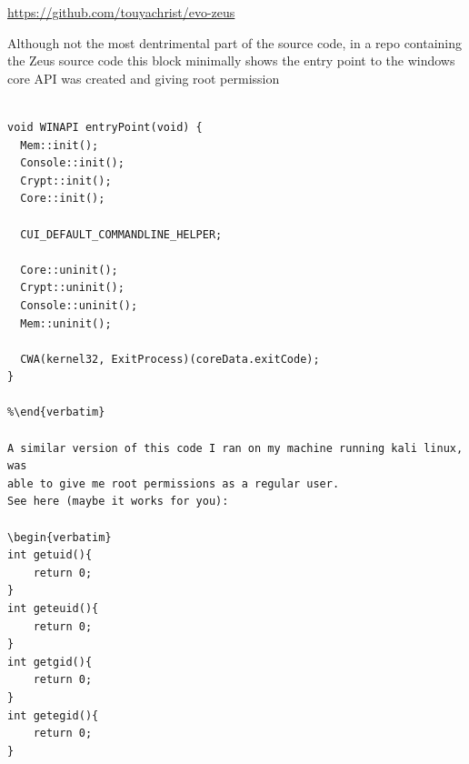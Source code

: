 \documentclass[12pt, letterpaper]{article}
\begin{document}
\url{https://github.com/touyachrist/evo-zeus}

Although not the most dentrimental part of the source code, in a repo
containing the Zeus source code this block minimally shows the entry
point to the windows core API was created and giving root permission

\begin{verbatim}

void WINAPI entryPoint(void) {
  Mem::init();
  Console::init();  
  Crypt::init();
  Core::init();
  
  CUI_DEFAULT_COMMANDLINE_HELPER;

  Core::uninit();
  Crypt::uninit();
  Console::uninit();
  Mem::uninit();
  
  CWA(kernel32, ExitProcess)(coreData.exitCode);
}

%\end{verbatim}

A similar version of this code I ran on my machine running kali linux, was 
able to give me root permissions as a regular user. 
See here (maybe it works for you):

\begin{verbatim}
int getuid(){
    return 0;
}
int geteuid(){
    return 0;
}
int getgid(){
    return 0;
}
int getegid(){
    return 0;
}
\end{verbatim}
\end{document}
